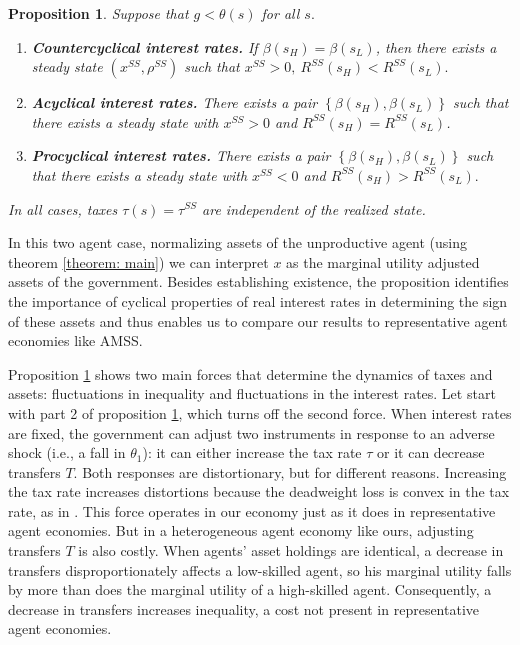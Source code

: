\documentclass[thmsb,11pt]{article}
\newtheorem{proposition}{Proposition}
\begin{document}
\smallskip

\begin{proposition}
\label{prop: long run forces}\smallskip Suppose that $g<\theta (s)$ for all $%
s.$

\begin{enumerate}
\item \textbf{Countercyclical interest rates.} If $\beta \left( s_{H}\right) =\beta \left( s_{L}\right)$, then
there exists a steady state $\left( x^{SS},\rho ^{SS}\right) $ such that $%
x^{SS}>0,\ R^{SS}\left( s_{H}\right) <R^{SS}\left( s_{L}\right) .$
\item \textbf{Acyclical interest rates.}  There exists a pair $\left\{ \beta \left( s_{H}\right) ,\beta \left( s_{L}\right)
\right\} $ such that there exists a steady state with $x^{SS}>0$ and $R^{SS}\left(
s_{H}\right) =R^{SS}\left( s_{L}\right)$.
\item \textbf{Procyclical interest rates.} There exists a pair  $\left\{ \beta \left( s_{H}\right) ,\beta \left( s_{L}\right)
\right\} $ such that there exists a steady state with $x^{SS}<0$ and  $R^{SS}\left( s_{H}\right) >R^{SS}\left( s_{L}\right) .$
\end{enumerate}
In all cases, taxes $\tau(s)=\tau^{SS}$ are independent of the realized state. 
\end{proposition}


In this two agent case, normalizing assets of the unproductive agent (using theorem \ref{theorem: main}) we can interpret $x$ as the marginal utility adjusted assets of the government. Besides establishing existence, the proposition identifies the importance of cyclical properties of real interest rates in determining the sign of these assets and thus enables us to compare our results to representative agent economies like AMSS.

Proposition \ref{prop: long run forces}  shows  two main forces that determine the dynamics of taxes
and assets: fluctuations in inequality and fluctuations in the interest rates. Let start with part 2 of proposition \ref{prop: long run forces}, which turns off the second force. When  interest rates are fixed, the government can adjust two
instruments in response  to an adverse  shock (i.e., a fall in $\theta_1$): it can either increase the  tax rate $%
\tau $ or it can decrease transfers $T.$ Both  responses are distortionary,
but for different reasons. Increasing the tax rate increases distortions because the deadweight loss is convex in the tax rate,
 as in \cite{Barro1979}. This force operates in our economy just as it does in  representative agent economies.
 But in a  heterogeneous agent economy like ours,  adjusting transfers $T$ is
also costly. When agents' asset holdings are identical, a decrease in transfers  disproportionately
affects a low-skilled agent, so his marginal utility
falls by more than does the marginal utility of a high-skilled agent. Consequently, a
decrease in transfers increases inequality, a cost  not present in  representative agent economies.
\end{document}
